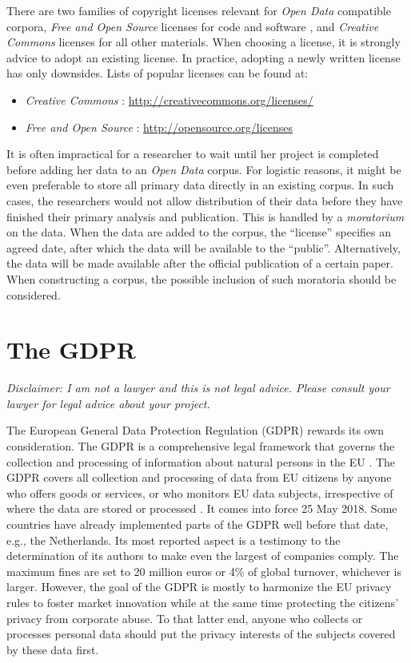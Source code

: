 \documentclass[10pt, a4paper]{article}
\begin{document}
There are two families of copyright licenses relevant for \emph{Open Data} compatible corpora, \emph{Free and Open Source} licenses for code and software \cite{FSF,OSI}, and \emph{Creative Commons} licenses \cite{CreativeCommons} for all other materials. When choosing a license, it is strongly advice to adopt an existing license. In practice, adopting a newly written license has only downsides. Lists of popular licenses can be found at:
\begin{itemize}
\item \emph{Creative Commons} \cite{CreativeCommons}: \url{http://creativecommons.org/licenses/}
\item \emph{Free and Open Source} \cite{OSI}: \url{http://opensource.org/licenses}
\end{itemize}

It is often impractical for a researcher to wait until her project is completed before adding her data to an \emph{Open Data} corpus. For logistic reasons, it might be even preferable to store all primary data directly in an existing corpus. In such cases, the researchers would not allow distribution of their data before they have finished their primary analysis and publication. This is handled by a \emph{moratorium} on the data. When the data are added to the corpus, the ``license'' specifies an agreed date, after which the data will be available to the ``public''. Alternatively, the data will be made available after the official publication of a certain paper. When constructing a corpus, the possible inclusion of such moratoria should be considered.

\section{The GDPR}
{\small \emph{Disclaimer: I am not a lawyer and this is not legal advice. Please consult your lawyer for legal advice about your project.}}
\vskip 0.5cm

\noindent The European General Data Protection Regulation (GDPR) rewards its own consideration. The GDPR is a comprehensive legal framework that governs the collection and processing of information about natural persons in the EU \cite{GDPR_EU}. The GDPR covers all collection and processing of data from EU citizens by anyone who offers goods or services, or who monitors EU data subjects, irrespective of where the data are stored or processed \cite{AllenOvery2016GDPR}. It comes into force 25 May 2018. Some countries have already implemented parts of the GDPR well before that date, e.g., the Netherlands. Its most reported aspect is a testimony to the determination of its authors to make even the largest of companies comply. The maximum fines are set to 20 million euros or 4\% of global turnover, whichever is larger. However, the goal of the GDPR is mostly to harmonize the EU privacy rules to foster market innovation while at the same time protecting the citizens' privacy from corporate abuse. To that latter end, anyone who collects or processes personal data should put the privacy interests of the subjects covered by these data first.
\end{document}

